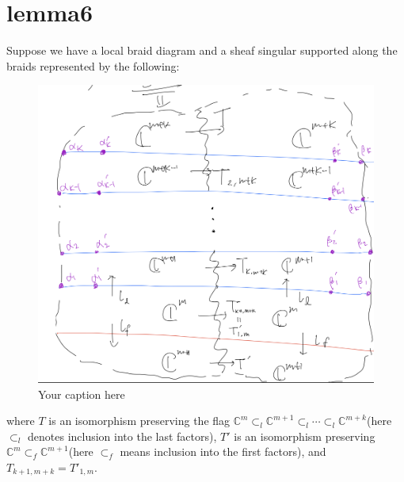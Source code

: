 \section{lemma6}
\begin{lemma}
\end{lemma}
Suppose we have a local braid diagram and a sheaf singular supported along the braids represented by the following:

\begin{figure}[H] %
    \centering
    \includegraphics[width=\linewidth]{diagrams/lemma6/1.png} %
    \caption{Your caption here}
    \label{fig:your-label}
\end{figure}
where $T$ is an isomorphism preserving the flag $\mathbb{C}^m\subset_l \mathbb{C}^{m+1}\subset_l\cdots\subset_l \mathbb{C}^{m+k}$(here $\subset_l$ denotes inclusion into the last factors), $T'$ is an isomorphism preserving $\mathbb{C}^m \subset_f \mathbb{C}^{m+1}$(here $\subset_f$ means inclusion into the first factors), and $T_{k+1,m+k}=T'_{1,m}$.


